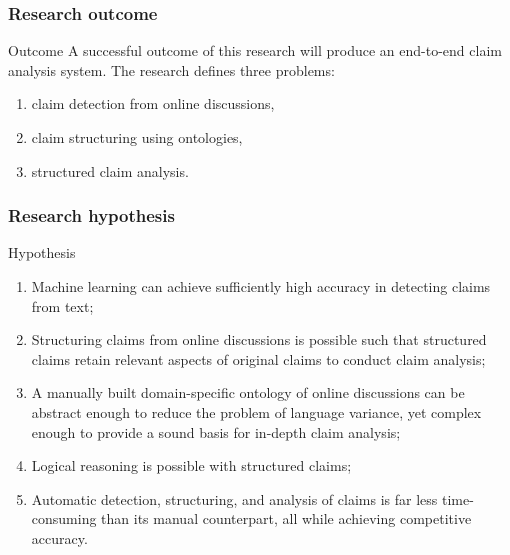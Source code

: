 \documentclass{beamer}
\begin{document}

\begin{frame}

	\frametitle{Research outcome}

\begin{block}{Outcome}
A successful outcome of this research will produce an end-to-end claim analysis
system. The research defines three problems: 
\begin{enumerate}
	\item claim detection from online discussions, 
	\item claim structuring using ontologies, 
	\item structured claim analysis.  
\end{enumerate}
\end{block}

\end{frame}

\begin{frame}
	\frametitle{Research hypothesis}
\begin{block}{Hypothesis}
	\begin{enumerate}
	\item Machine learning can achieve sufficiently high accuracy in detecting claims from text;
	\item Structuring claims from online discussions is possible such that structured claims retain relevant aspects of original claims to
	conduct claim analysis;
	\item A manually built domain-specific ontology of online discussions can be abstract enough to reduce the problem of language
	variance, yet complex enough to provide a sound basis for in-depth claim analysis;
	\item Logical reasoning is possible with structured claims;
	\item Automatic detection, structuring, and analysis of claims is far less time-consuming than its manual counterpart, all while achieving
	competitive accuracy.
	\end{enumerate}
\end{block}

\end{frame}

\end{document}
